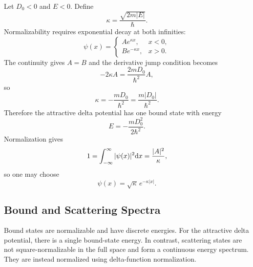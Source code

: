 Let $D_0<0$ and $E<0$. Define
\begin{equation}
 \kappa=\frac{\sqrt{2m|E|}}{\hbar}.
\end{equation}
Normalizability requires exponential decay at both infinities:
\begin{equation}
 \psi(x)=
 \begin{cases}
A e^{\kappa x}, & x<0,\\
 B e^{-\kappa x}, & x>0.
 \end{cases}
\end{equation}
The continuity gives $A=B$ and the derivative jump condition becomes
\begin{equation}
 -2\kappa A=\frac{2mD_0}{\hbar^2}A,
\end{equation}
so
\begin{equation}
 \kappa=-\frac{mD_0}{\hbar^2}=\frac{m|D_0|}{\hbar^2}.
\end{equation}
Therefore the attractive delta potential has one bound state with energy
\begin{equation}\label{attractive delta potential:g.s. energy}
 \boxed{E=-\frac{mD_0^2}{2\hbar^2}.}
\end{equation}
Normalization gives
\begin{equation}
 1=\int_{-\infty}^{\infty}|\psi(x)|^2\mathrm{d} x
 =\frac{|A|^2}{\kappa},
\end{equation}
so one may choose
\begin{equation}
 \boxed{\psi(x)=\sqrt{\kappa}\,e^{-\kappa|x|}.}
\end{equation}

\subsection{Bound and Scattering Spectra}

Bound states are normalizable and have discrete energies. For the attractive
delta potential, there is a single bound-state energy. In contrast, scattering states are
not square-normalizable in the full space and form a continuous energy
spectrum. They are instead normalized using delta-function normalization. 



